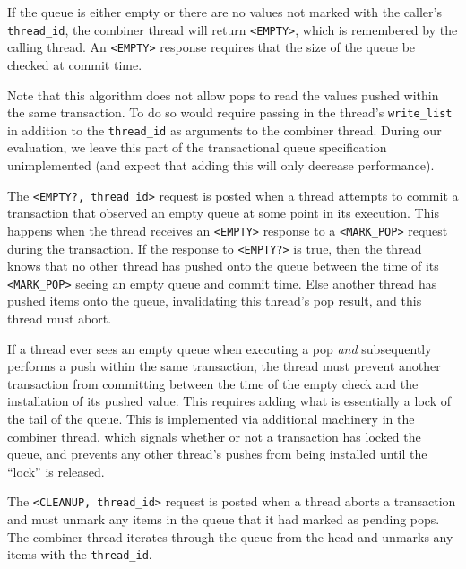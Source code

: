 If the queue is either empty or there are no values not marked with the caller's \texttt{thread\_id}, the combiner thread will return \texttt{<EMPTY>}, which is remembered by the calling thread. An \texttt{<EMPTY>} response requires that the size of the queue be checked at commit time.

Note that this algorithm does not allow pops to read the values pushed within the same transaction. To do so would require passing in the thread's \texttt{write\_list} in addition to the \texttt{thread\_id} as arguments to the combiner thread. During our evaluation, we leave this part of the transactional queue specification unimplemented (and expect that adding this will only decrease performance).

The \texttt{<EMPTY?, thread\_id>} request is posted when a thread attempts to commit a transaction that observed an empty queue at some point in its execution. This happens when the thread receives an \texttt{<EMPTY>} response to a \texttt{<MARK\_POP>} request during the transaction. If the response to \texttt{<EMPTY?>} is true, then the thread knows that no other thread has pushed onto the queue between the time of its \texttt{<MARK\_POP>} seeing an empty queue and commit time. Else another thread has pushed items onto the queue, invalidating this thread's pop result, and this thread must abort.

If a thread ever sees an empty queue when executing a pop \emph{and} subsequently performs a push within the same transaction, the thread must prevent another transaction from committing between the time of the empty check and the installation of its pushed value. This requires adding what is essentially a lock of the tail of the queue. This is implemented via additional machinery in the combiner thread, which signals whether or not a transaction has locked the queue, and prevents any other thread's pushes from being installed until the ``lock'' is released.

The \texttt{<CLEANUP, thread\_id>} request is posted when a thread aborts a transaction and must unmark any items in the queue that it had marked as pending pops. The combiner thread iterates through the queue from the head and unmarks any items with the \texttt{thread\_id}.


%


